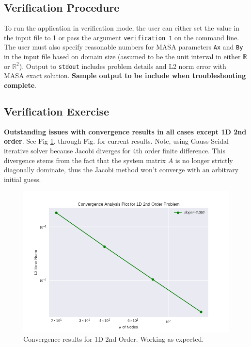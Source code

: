\documentclass[letterpaper,12pt]{article}
\begin{document}
\subsection{Verification Procedure}
To run the application in verification mode, the user can either set the value in the input file to 1 or pass the argument \verb|verification 1| on the command line. The user must also specify reasonable numbers for MASA parameters \verb|Ax| and \verb|By| in the input file based on domain size (assumed to be the unit interval in either $\mathbb{R}$ or $\mathbb{R}^2$). Output to \verb|stdout| includes problem details and L2 norm error with MASA exact solution. \textbf{Sample output to be include when troubleshooting complete}.
\subsection{Verification Exercise}
\textbf{Outstanding issues with convergence results in all cases except 1D 2nd order}. See Fig \ref{fig:1d2nd}. through Fig. for current results. Note, using Gauss-Seidal iterative solver because Jacobi diverges for 4th order finite difference. This divergence stems from the fact that the system matrix $A$ is no longer strictly diagonally dominate, thus the Jacobi method won't converge with an arbitrary initial guess.

\begin{figure}[h]
\centering
\label{fig:1d2nd}
\includegraphics[width=1 \textwidth]{1d2nd.PNG}
\caption{Convergence results for 1D 2nd Order. Working as expected.}
\end{figure}
\end{document}
